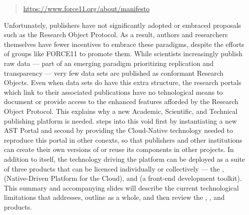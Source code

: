 \documentclass[10pt,letterpaper]{article}
\newcommand{\rpdfLink}[1]{\href{#1}{\small{#1}}}
\begin{document}
\begin{quote}{}
\rpdfLink{https://www.force11.org/about/manifesto}
\end{quote}
\qvspace{}
\p{}
Unfortunately, publishers have not significantly adopted 
or embraced proposals such as the Research Object Protocol.  
As a result, authors and researchers themselves have 
fewer incentives to embrace these paradigms, 
despite the efforts of groups like FORCE11 to promote them.  
While scientists increasingly publish raw data --- part of 
an emerging paradigm prioritizing replication 
and transparency --- very few data sets are published 
as conformant Research Objects.  
Even when data sets do have this 
extra structure, the research portals which 
link to their associated publications have 
no tehnological means to document 
or provide access to the enhanced features 
afforded by the Research Object Protocol.
\p{}
This explains why a new Academic, Scientific, and Technical 
publishing platform is needed.  {\lfMOSAIC} 
steps into this void first by instantiating a new 
AST Portal and second by providing the Cloud-Native 
technology needed to reproduce this portal in 
other conexts, so that publishers and 
other institutions can create their own versions of 
{\MOSAIC} or reuse its components in other projects.
\p{}
In addition to {\MOSAIC} itself, 
the technology driving the platform can be 
deployed as a suite of three products that can 
be licenced individually or collectively --- the
{\MOSAIC} {\SDK}, {\NDPCloud} (Native-Driven Platform 
for the Cloud), and {\VersatileUX} (a front-end 
development toolkit).  
\p{}
This summary and accompanying slides will describe the 
current technological limitations that {\MOSAIC} 
addresses, outline {\MOSAIC} as a whole, 
and then review the {\MOSAIC} {\SDK}, {\NDPCloud}, 
and {\VersatileUX} products.
\p{}
\end{document}
